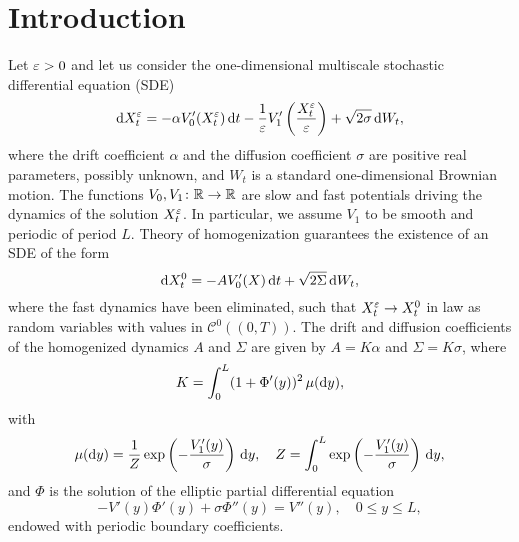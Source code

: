\documentclass[10pt]{article}
\begin{document}
\maketitle	


%
%

\normalsize
\section{Introduction}

Let $\varepsilon > 0$ and let us consider the one-dimensional multiscale stochastic differential equation (SDE)
\begin{equation}\label{eq:SDE_MS}
	\mathrm{d} X_t^\varepsilon = -\alpha V_0'(X_t^\varepsilon) \,\mathrm{d} t - \frac1{\varepsilon} V_1'\left(\frac{X_t^\varepsilon}{\varepsilon}\right) + \sqrt{2\sigma} \,\mathrm{d} W_t,
\end{equation}
where the drift coefficient $\alpha$ and the diffusion coefficient $\sigma$ are positive real parameters, possibly unknown, and $W_t$ is a standard one-dimensional Brownian motion. The functions $V_0, V_1\colon \mathbb{R} \to \mathbb{R}$ are slow and fast potentials driving the dynamics of the solution $X_t^\varepsilon$. In particular, we assume $V_1$ to be smooth and periodic of period $L$. Theory of homogenization \cite{BLP78} guarantees the existence of an SDE of the form
\begin{equation}\label{eq:SDE_HOM}
	\mathrm{d} X_t^0 = -A V_0'(X) \,\mathrm{d} t + \sqrt{2\Sigma} \,\mathrm{d} W_t,
\end{equation}
where the fast dynamics have been eliminated, such that $X_t^\varepsilon \to X_t^0$ in law as random variables with values in $\mathcal C^0((0, T))$. The drift and diffusion coefficients of the homogenized dynamics $A$ and $\Sigma$ are given by $A = K\alpha$ and $\Sigma = K\sigma$, where
\begin{equation}
	K = \int_0^L (1 + \Phi'(y))^2 \, \mu(\mathrm{d} y),
\end{equation}
with 
\begin{equation}
	\mu(\mathrm{d} y) = \frac1Z \exp\left(-\frac{V_1'(y)}{\sigma}\right) \,\mathrm{d} y, \quad Z = \int_0^L \exp\left(-\frac{V_1'(y)}{\sigma}\right) \,\mathrm{d} y,
\end{equation}
and $\Phi$ is the solution of the elliptic partial differential equation
\begin{equation}
	-V'(y)\Phi'(y) + \sigma \Phi''(y) = V''(y), \quad 0 \leq y \leq L,
\end{equation}
endowed with periodic boundary coefficients.
\end{document}
